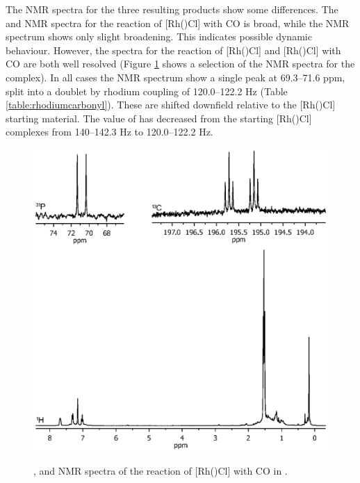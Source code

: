 The NMR spectra for the three resulting products show some differences.  The \proton{} and \carbon{} NMR spectra for the reaction of [Rh(\tButhixantphosk)Cl] with CO is broad, while the \phosphorus{} NMR spectrum shows only slight broadening.  This indicates possible dynamic behaviour.  However, the spectra for the reaction of [Rh(\tBusixantphosk)Cl] and [Rh(\tBuxantphosk)Cl] with CO are both well resolved (Figure \ref{Rhcarbonylnmr} shows a selection of the NMR spectra for the \tBuxantphos{} complex).  In all cases the \phosphorus{} NMR spectrum show a single peak at 69.3--71.6 ppm, split into a doublet by rhodium coupling of 120.0--122.2 Hz (Table \ref{table:rhodiumcarbonyl}).  These are shifted downfield relative to the [Rh(\tBuxantphosk)Cl] starting material.  The value of \JRhP{} has decreased from the starting [Rh(\tBuxantphosk)Cl] complexes from 140--142.3 Hz to 120.0--122.2 Hz.

\begin{figure}[htbp]
\begin{center}
\vspace{0.5cm}
\includegraphics[trim = 2.5cm 7.2cm 2.5cm 5.0cm, clip]{../NMR/7017.eps}
\caption[NMR spectra of [Rh(\tBuxantphos)Cl{]} with CO]{\phosphorus, \carbon{} and \proton{} NMR spectra of the reaction of [Rh(\tBuxantphos)Cl] with CO in .}
\vspace{0.2cm}
\label{Rhcarbonylnmr}
\end{center}
\end{figure}
\vspace{0.2cm}

